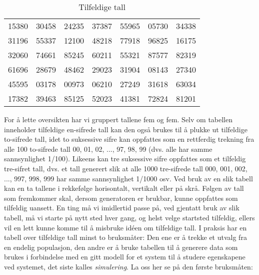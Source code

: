 \begin{table}
\begin{tabular}{|ccccccc|} \hline
15380 & 30458 & 24235 & 37387 & 55965 & 05730 & 34338 \\
31196 & 55337 & 12100 & 48218 & 77918 & 96825 & 16175 \\
32060 & 74661 & 85245 & 60211 & 55321 & 87577 & 82319 \\
61696 & 28679 & 48462 & 29023 & 31904 & 08143 & 27340 \\
45595 & 03178 & 00973 & 06210 & 27249 & 31618 & 63034 \\
17382 & 39463 & 85125 & 52023 & 41381 & 72824 & 81201 \\ \hline
\end{tabular}
\caption{Tilfeldige tall}
\label{tab:tilfeldige_tall}
\end{table}
                                                
For å lette oversikten har vi gruppert tallene fem og fem. Selv
om tabellen inneholder tilfeldige en-sifrede tall kan den også
brukes til å plukke ut tilfeldige to-sifrede tall, idet to
suksessive sifre kan oppfattes som en rett\-ferdig trekning fra
alle 100 to-sifrede tall 00, 01, 02, ..., 97, 98, 99 (dvs. alle
har samme sannsynlighet 1/100). Likeens kan tre suksessive sifre
oppfattes som et tilfeldig tre-sifret tall, dvs. et tall generert
slik at alle 1000 tre-sifrede tall 000, 001, 002, ..., 997, 998,
999 har samme sannsynlighet 1/1000 osv. Ved bruk av en slik
tabell kan en ta tallene i rekkefølge horisontalt, vertikalt
eller på skrå. Følgen av tall som fremkommer skal, dersom
generatoren er brukbar, kunne oppfattes som tilfeldig uansett. En
ting må vi imidlertid passe på, ved gjentatt bruk av slik tabell,
må vi starte på nytt sted hver gang, og helst velge startsted
tilfeldig, ellers vil en lett kunne komme til å misbruke id\'{e}en om
tilfeldige tall. I praksis har en tabell over tilfeldige tall
minst to bruksmåter: Den ene er å trekke et utvalg fra en endelig
populasjon, den andre er å bruke tabellen til å generere data som
brukes i forbindelse med en gitt modell for et system til å
studere egenskapene ved systemet, det siste kalles {\em
simulering}. La oss her se på den første bruksmåten:\\


